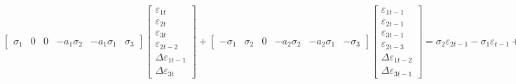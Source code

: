 \documentclass[a4paper,12pt]{article}
\begin{document}
$%
\begin{bmatrix}
\sigma _{1} & 0 & 0 & -a_{1}\sigma _{2} & -a_{1}\sigma _{1} & \sigma _{3}%
\end{bmatrix}%
\begin{bmatrix}
\varepsilon _{1t} \\ 
\varepsilon _{2t} \\ 
\varepsilon _{3t} \\ 
\varepsilon _{2t-2} \\ 
\Delta \varepsilon _{1t-1} \\ 
\Delta \varepsilon _{3t}%
\end{bmatrix}%
+%
\begin{bmatrix}
-\sigma _{1} & \sigma _{2} & 0 & -a_{2}\sigma _{2} & -a_{2}\sigma _{1} & 
-\sigma _{3}%
\end{bmatrix}%
\begin{bmatrix}
\varepsilon _{1t-1} \\ 
\varepsilon _{2t-1} \\ 
\varepsilon _{3t-1} \\ 
\varepsilon _{2t-3} \\ 
\Delta \varepsilon _{1t-2} \\ 
\Delta \varepsilon _{3t-1}%
\end{bmatrix}%
=\allowbreak \sigma _{2}\varepsilon _{2t-1}-\sigma _{1}\varepsilon
_{t-1}+\sigma _{1}\varepsilon _{t}+\Delta \sigma _{3}\varepsilon
_{3t}-\Delta \sigma _{3}\varepsilon _{3t-1}-\sigma _{2}a_{1}\varepsilon
_{2t-2}-\sigma _{2}a_{2}\varepsilon _{2t-3}-\Delta \sigma
_{1}a_{1}\varepsilon _{t-1}-\Delta \sigma _{1}a_{2}\varepsilon
_{t-2}\allowbreak $

\bigskip 

\EAW

\bigskip 

\bigskip 

\bigskip 

\bigskip 

\bigskip 
\end{document}
